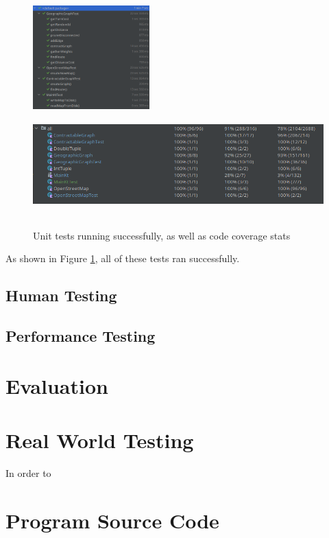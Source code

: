 \documentclass[11pt,twoside,a4paper]{article}
\begin{document}
\begin{figure}[t]
    \begin{center}
        \includegraphics[height=4cm]{test.png}
        \includegraphics[height=4cm]{coverage.png}
    \end{center}
    \caption{Unit tests running successfully, as well as code coverage stats}
    \label{testsuccess}
\end{figure}
As shown in Figure \ref{testsuccess}, all of these tests ran successfully. 
\subsection{Human Testing}      
\subsection{Performance Testing}
\section{Evaluation}
\newpage
\appendix
\section{Real World Testing}
In order to  
\section{Program Source Code}
\newpage
{}
\printbibliography
\label{end}
\end{document}
